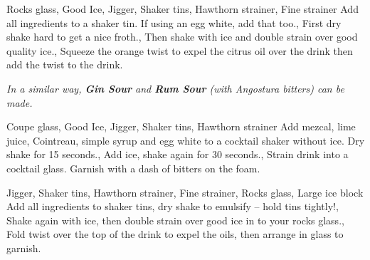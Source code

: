 \documentclass[../main.tex]{subfiles}
\begin{document}
\clearpage
{}

{Rocks glass, Good Ice, Jigger, Shaker tins, Hawthorn strainer, Fine strainer}
{
    {Add all ingredients to a shaker tin. If using an egg white, add that too.},
    {First dry shake hard to get a nice froth.},
    {Then shake with ice and double strain over good quality ice.},
    {Squeeze the orange twist to expel the citrus oil over the drink then add the twist to the drink.}
}

\begin{center}
    \textit{In a similar way, \textbf{Gin Sour} and \textbf{Rum Sour} (with Angostura bitters) can be made.}
\end{center}

\cocktailDivider

{Coupe glass, Good Ice, Jigger, Shaker tins, Hawthorn strainer}
{
    {Add mezcal, lime juice, Cointreau, simple syrup and egg white to a cocktail shaker without ice. Dry shake for 15 seconds.},
    {Add ice, shake again for 30 seconds.},
    {Strain drink into a cocktail glass. Garnish with a dash of bitters on the foam.}
}

\cocktailDivider

%
{Jigger, Shaker tins, Hawthorn strainer, Fine strainer, Rocks glass, Large ice block}
%
{
	{Add all ingredients to shaker tins, dry shake to emulsify -- hold tins tightly!},
	{Shake again with ice, then double strain over good ice in to your rocks glass}.,
	{Fold twist over the top of the drink to expel the oils, then arrange in glass to garnish.}
}
\end{document}

